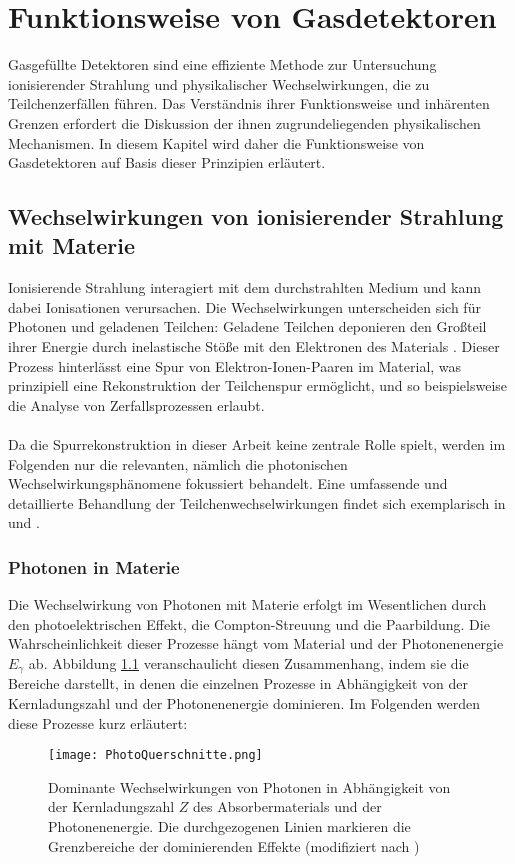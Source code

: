 \chapter{Funktionsweise von Gasdetektoren}

\noindent Gasgefüllte Detektoren sind eine effiziente Methode zur Untersuchung ionisierender Strahlung und physikalischer Wechselwirkungen, die zu Teilchenzerfällen führen. Das Verständnis ihrer Funktionsweise und inhärenten Grenzen erfordert die Diskussion der ihnen zugrundeliegenden physikalischen Mechanismen. In diesem Kapitel wird daher die Funktionsweise von Gasdetektoren auf Basis dieser Prinzipien erläutert.

	\section{Wechselwirkungen von ionisierender Strahlung mit Materie}
	Ionisierende Strahlung interagiert mit dem durchstrahlten Medium und kann dabei Ionisationen verursachen.  Die Wechselwirkungen unterscheiden sich für Photonen und geladenen Teilchen: Geladene Teilchen deponieren den Großteil ihrer Energie durch inelastische Stöße mit den Elektronen des Materials \cite{Leo}. Dieser Prozess hinterlässt eine Spur von Elektron-Ionen-Paaren im Material, was prinzipiell eine Rekonstruktion der Teilchenspur ermöglicht, und so beispielsweise die Analyse von Zerfallsprozessen erlaubt.\\
	\\
	Da die Spurrekonstruktion in dieser Arbeit keine zentrale Rolle spielt, werden im Folgenden nur die relevanten, nämlich die photonischen Wechselwirkungsphänomene fokussiert behandelt. Eine umfassende und detaillierte Behandlung der Teilchenwechselwirkungen findet sich exemplarisch in \cite{Leo} und \cite{Sauli_Multiwire}.

	\subsection{Photonen in Materie} \label{chap:Photonen}
	Die Wechselwirkung von Photonen mit Materie erfolgt im Wesentlichen durch den photoelektrischen Effekt, die Compton-Streuung und die Paarbildung.  Die Wahrscheinlichkeit dieser Prozesse hängt vom Material und der Photonenenergie $E_{\gamma}$ ab. Abbildung \ref{fig:WirkungsquerschnittePhotonen} veranschaulicht diesen Zusammenhang, indem sie die Bereiche darstellt, in denen die einzelnen Prozesse in Abhängigkeit von der Kernladungszahl und der Photonenenergie dominieren. Im Folgenden werden diese Prozesse kurz erläutert:
	\begin{figure}[h]
		\centering
		\texttt{[image: PhotoQuerschnitte.png]}
		\caption{Dominante Wechselwirkungen von Photonen in Abhängigkeit von der Kernladungszahl $Z$ des Absorbermaterials und der Photonenenergie. Die durchgezogenen Linien markieren die Grenzbereiche der dominierenden Effekte (modifiziert nach \cite{DemtroderKerne})}
		\label{fig:WirkungsquerschnittePhotonen}
	\end{figure}
	
